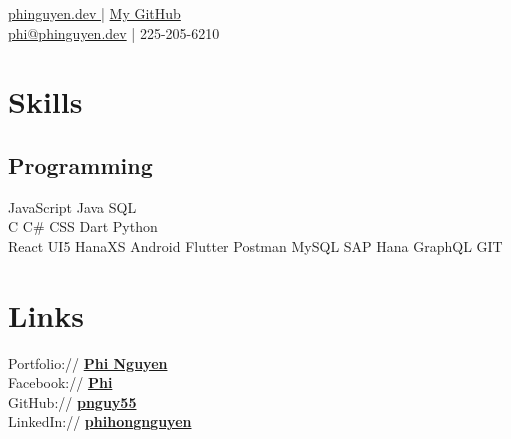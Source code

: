 \documentclass[]{deedy-resume-openfont}
\begin{document}
%
%
\lastupdated

%
%
{ \href{https://phinguyen.dev}{phinguyen.dev }| \href{https://github.com/pnguy55}{ My GitHub}\\
\href{mailto:phi@phinguyen.dev}{phi@phinguyen.dev} | 225-205-6210
}

%
%

\begin{minipage}[t]{0.33\textwidth} 


\section{Skills}
\subsection{Programming}
JavaScript \textbullet{}   Java \textbullet{} SQL\\
C \textbullet{} C\# \textbullet{} CSS \textbullet{} Dart \textbullet{} Python \\
React \textbullet{} UI5 \textbullet{} HanaXS \textbullet{} Android \textbullet{} Flutter \textbullet{} Postman \textbullet{} MySQL \textbullet{} SAP Hana \textbullet{} GraphQL \textbullet{} GIT
\sectionsep



\section{Links} 
Portfolio:// \href{https://phinguyen.dev}{\bf Phi Nguyen} \\
Facebook:// \href{https://facebook/dd}{\bf Phi} \\
GitHub:// \href{https://github.com/pnguy55}{\bf pnguy55}\\
LinkedIn://  \href{https://www.linkedin.com/in/debarghyadas}{\bf phihongnguyen} \\


\end{minipage}
\end{document}

